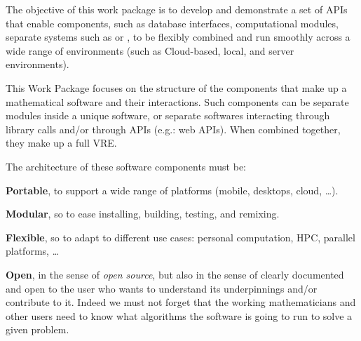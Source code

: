 \begin{workpackage}[id=component-architecture,wphases=0-48!.5,
  title=Component Architecture,lead=UV,
  PSRM=64,UVRM=8,SARM=16, USHRM=4, USORM=6, UORM=4, LLRM=22]

  \begin{wpobjectives}
    The objective of this work package is to develop and demonstrate a
    set of APIs that enable components, such as database interfaces,
    computational modules, separate systems such as \GAP or \Sage, to
    be flexibly combined and run smoothly across a wide range of
    environments (such as Cloud-based, local, and server environments).
  \end{wpobjectives}

  \begin{wpdescription}
    This Work Package focuses on the structure of the components that make
    up a mathematical software and their interactions. Such components
    can be separate modules inside a unique software, or separate
    softwares interacting through library calls and/or through APIs
    (e.g.: web APIs). When combined together, they make up a full VRE.

    The architecture of these software components must be:
    \begin{compactitem}
    \item \textbf{Portable}, to support a wide range of platforms
      (mobile, desktops, cloud, \dots).
    \item \textbf{Modular}, so to ease installing, building, testing,
      and remixing.
    \item \textbf{Flexible}, so to adapt to different use cases:
      personal computation, HPC, parallel platforms, \dots
    \item \textbf{Open}, in the sense of \emph{open source}, but also
      in the sense of clearly documented and open to
      the user who wants to understand its underpinnings and/or
      contribute to it. Indeed we must not forget that the working
      mathematicians and other users need to know what algorithms the software is
      going to run to solve a given problem.
    \end{compactitem}
  \end{wpdescription}


\end{workpackage}
